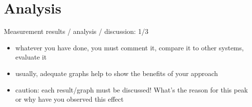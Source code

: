 \chapter{Analysis}

Measurement results / analysis / discussion: 1/3 

\begin{itemize}
\item whatever you have done, you must comment it, compare it to other systems, evaluate it
\item usually, adequate graphs help to show the benefits of your approach
\item caution: each result/graph must be discussed! What's the reason for this peak or why have you observed this effect 
\end{itemize}
